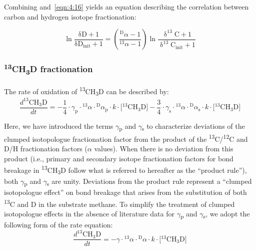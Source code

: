 Combining  and~\ref{eqn:4:16} yields an equation describing the correlation
between carbon and hydrogen isotope fractionation:

\begin{equation}\label{eqn:4:17}
\ln\frac{\mathrm{\text{δD}} + 1}{\mathrm{\text{δD}}_{\mathrm{\text{init}}} + 1} = \left( \frac{{}_{}^{\mathrm{D}}\alpha - 1}{{}_{}^{13}\alpha - 1} \right)\ln\frac{\mathrm{\updelta}^{13}\mathrm{C} + 1}{{\mathrm{\updelta}^{13}\mathrm{C}}_{\mathrm{\text{init}}} + 1}
\end{equation}

\subsubsection{\texorpdfstring{\textsuperscript{13}CH\textsubscript{3}D
		fractionation}{13CH3D fractionation}}\label{sec:4:13ch3d-fractionation}

The rate of oxidation of \textsuperscript{13}CH\textsubscript{3}D can be
described by:
\begin{equation}\label{eqn:4:18}
\frac{d_{}^{\mathrm{13}}{\mathrm{C}\mathrm{H}_{\mathrm{3}}\mathrm{D}}}{{dt}} = \textstyle - \frac{1}{4} \cdot \gamma_{\mathrm{p}} \cdot{}_{}^{13}\alpha \cdot{}_{}^{\mathrm{D}}\alpha_{\mathrm{p}} \cdot k \cdot \bigl\lbrack{}_{}^{\mathrm{13}}{\mathrm{C}\mathrm{H}_{\mathrm{3}}\mathrm{D}} \bigr\rbrack - \frac{3}{4} \cdot \gamma_{\mathrm{s}} \cdot{}_{}^{13}\alpha \cdot{}_{}^{\mathrm{D}}\alpha_{\mathrm{s}} \cdot k \cdot \bigl\lbrack{}_{}^{\mathrm{13}}{\mathrm{C}\mathrm{H}_{\mathrm{3}}\mathrm{D}} \bigr\rbrack
\end{equation}

Here, we have introduced the terms $\gamma$\textsubscript{p} and
$\gamma$\textsubscript{s} to characterize deviations of the clumped
isotopologue fractionation factor from the product of the
\textsuperscript{13}C/\textsuperscript{12}C and D/H fractionation
factors ($\alpha$ values). When there is no deviation from this product (i.e.,
primary and secondary isotope fractionation factors for bond breakage in
\textsuperscript{13}CH\textsubscript{3}D follow what is referred to
hereafter as the ``product rule''), both $\gamma$\textsubscript{p} and
$\gamma$\textsubscript{s} are unity. Deviations from the product rule represent
a ``clumped isotopologue effect'' on bond breakage that arises from the
substitution of both \textsuperscript{13}C and D in the substrate
methane. To simplify the treatment of clumped isotopologue effects in
the absence of literature data for $\gamma$\textsubscript{p} and
$\gamma$\textsubscript{s}, we adopt the following form of the rate equation:
\begin{equation}\label{eqn:4:19}
\frac{d_{}^{\mathrm{13}}{\mathrm{C}\mathrm{H}_{\mathrm{3}}\mathrm{D}}}{{dt}} = - \gamma \cdot{}_{}^{13}\alpha \cdot{}_{}^{\mathrm{D}}\alpha \cdot k \cdot \bigl\lbrack{}_{}^{\mathrm{13}}{\mathrm{C}\mathrm{H}_{\mathrm{3}}\mathrm{D}} \bigr\rbrack
\end{equation}

